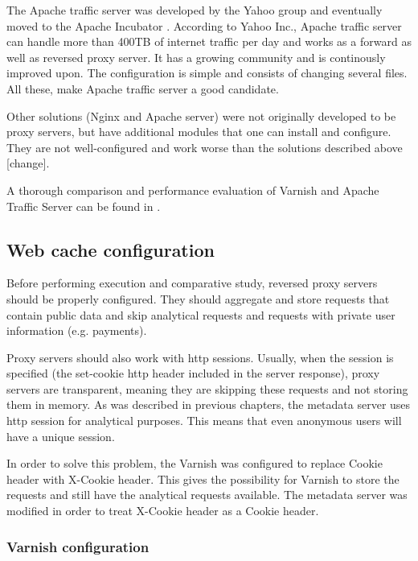 The Apache traffic server was developed by the Yahoo group and eventually moved to the Apache Incubator \cite{GuApacheTrafficUri}. According to Yahoo Inc., Apache traffic server can handle more than 400TB of internet traffic per day and works as a forward as well as reversed proxy server. It has a growing community and is continously improved upon. The configuration is simple and consists of changing several files. All these, make Apache traffic server a good candidate.  

Other solutions (Nginx and Apache server) were not originally developed to be proxy servers, but have additional modules that one can install and configure. They are not well-configured and work worse than the solutions described above \cite{GuApacheTrafficUri}[change].

A thorough comparison and performance evaluation of Varnish and Apache Traffic Server can be found in \cite{VarnApacheReverse}.    


\subsection{Web cache configuration}

Before performing execution and comparative study, reversed proxy servers should be properly configured. They should aggregate and store requests that contain public data and skip analytical requests and requests with private user information (e.g. payments).

Proxy servers should also work with http sessions. Usually, when the session is specified (the set-cookie http header included in the server response), proxy servers are transparent, meaning they are skipping these requests and not storing them in memory. As was described in previous chapters, the metadata server uses http session for analytical purposes. This means that even anonymous users will have a unique session. 

In order to solve this problem, the Varnish was configured to replace Cookie header with X-Cookie header. This gives the possibility for Varnish to store the requests and still have the analytical requests available. The metadata server was modified in order to treat X-Cookie header as a Cookie header.   

\subsubsection{Varnish configuration}

